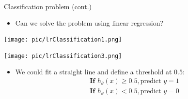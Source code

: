 \documentclass[serif, aspectratio=169]{beamer}
\begin{document}
\begin{frame}{Classification problem (cont.)}
    \begin{itemize}
        \item Can we solve the problem using linear regression?
    \end{itemize}
    
    \begin{minipage}{0.48\linewidth}
        \centering
        \texttt{[image: pic/lrClassification1.png]}
    \end{minipage}
    \hfill
    \begin{minipage}{0.48\linewidth}
        \centering
        \texttt{[image: pic/lrClassification3.png]}
    \end{minipage}
    
    \begin{itemize}
        \item We could fit a straight line and define a threshold at $0.5$:
            \begin{align*}
                & \textbf{If  } h_\theta (x) \geq 0.5, \text{predict  } y=1 \\
                & \textbf{If  } h_\theta (x) < 0.5, \text{predict  } y=0
            \end{align*}
    \end{itemize}
\end{frame}
\end{document}
